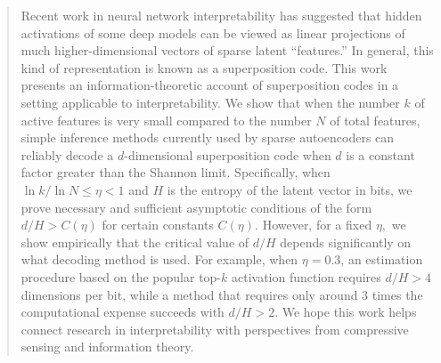 \begin{abstract}
Recent work in neural network interpretability has suggested that hidden activations of some deep models can be viewed as linear projections of much higher-dimensional vectors of sparse latent ``features.'' In general, this kind of representation is known as a superposition code. This work presents an information-theoretic account of superposition codes in a setting applicable to interpretability. We show that when the number $k$ of active features is very small compared to the number $N$ of total features, simple inference methods currently used by sparse autoencoders can reliably decode a $d$-dimensional superposition code when $d$ is a constant factor greater than the Shannon limit. Specifically, when $\ln k / \ln N \le \eta < 1$ and $H$ is the entropy of the latent vector in bits, we prove necessary and sufficient asymptotic conditions of the form $d / H > C(\eta)$ for certain constants $C(\eta).$ However, for a fixed $\eta,$ we show empirically that the critical value of $d/H$ depends significantly on what decoding method is used. For example, when $\eta = 0.3$, an estimation procedure based on the popular top-$k$ activation function requires $d/H > 4$ dimensions per bit, while a method that requires only around $3$ times the computational expense succeeds with $d/H > 2.$ We hope this work helps connect research in interpretability with perspectives from compressive sensing and information theory.
\end{abstract}
